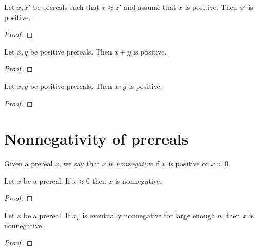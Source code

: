\begin{lemma}
    \leanok
    Let $x,x'$ be prereals such that $x \approx x'$ and assume that $x$ is positive.
    Then $x'$ is positive.
\end{lemma}
\begin{proof}
    \leanok
\end{proof}

\begin{lemma}
    \leanok
    Let $x,y$ be positive prereals.
    Then $x + y$ is positive.
\end{lemma}
\begin{proof}
    \leanok
\end{proof}

\begin{lemma}
    \leanok
    Let $x,y$ be positive prereals.
    Then $x \cdot y$ is positive.
\end{lemma}
\begin{proof}
    \leanok
\end{proof}

\section{Nonnegativity of prereals}

\begin{definition}
    \leanok
    Given a prereal $x$, we say that $x$ is \emph{nonnegative} if $x$ is positive or $x \approx 0$.
\end{definition}

\begin{lemma}
    \leanok
    Let $x$ be a prereal.
    If $x \approx 0$ then $x$ is nonnegative.
\end{lemma}
\begin{proof}
    \leanok
\end{proof}

\begin{lemma}
    \leanok
    Let $x$ be a prereal.
    If $x_n$ is eventually nonnegative for large enough $n$, then $x$ is nonnegative.
\end{lemma}
\begin{proof}
    \leanok
\end{proof}


